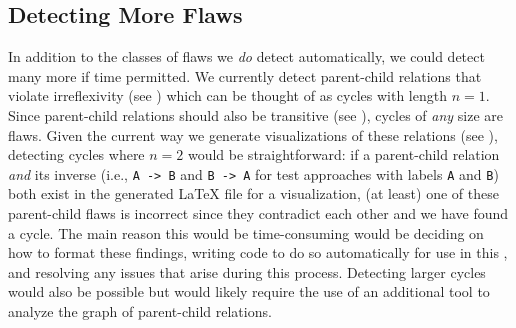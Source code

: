 \subsection{Detecting More Flaws}\label{future-detect-flaws}
In addition to the classes of flaws we \emph{do} detect automatically, we could
detect many more if time permitted. We currently detect parent-child relations
that violate irreflexivity (see ) which can be thought of as
cycles with length $n=1$. Since parent-child relations should also be
transitive (see ), cycles of \emph{any} size are flaws.
Given the current way we generate visualizations of these relations (see
), detecting cycles where $n=2$ would be straightforward: if
a parent-child relation \emph{and} its inverse (i.e., \texttt{A~->~B} and
\texttt{B~->~A} for test approaches with labels \texttt{A} and \texttt{B}) both
exist in the generated \LaTeX{} file for a visualization, (at least) one of
these parent-child flaws is incorrect since they contradict each other and we
have found a cycle. The main reason this would be time-consuming would be
deciding on how to format these findings, writing code to do so automatically
for use in this \docType{}, and resolving any issues that arise during this
process. Detecting larger cycles would also be possible but would likely
require the use of an additional tool to analyze the graph of parent-child
relations.
